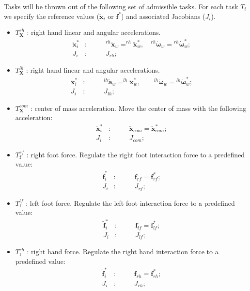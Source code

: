 \documentclass[12pt,a4paper,twoside]{article}
\begin{document}
Tasks will be thrown out  of the following set of admissible tasks. For each task $T_i$ we specify the reference values ($\ddot {\bm x}_i$ or $\bm f^*$) and associated Jacobians ($J_i$). 
\begin{itemize}

\item $T^{rh}_{\bm X}$ : right hand linear and angular accelerations. 
\begin{eqnarray*}
\ddot {\bm x}^*_{i} &:& \qquad ^{rh}{\ddot {\bm x}}_w = ^{rh}{\ddot {\bm x}}^*_w, \quad {}^{rh}{\dot {\bm \omega}}_w = {}^{rh}{\dot {\bm \omega}}_w^*;\\
J_i &:& \qquad J_{rh};
\end{eqnarray*}

\item $T^{lh}_{\bm X}$ : right hand linear and angular accelerations. 
\begin{eqnarray*}
\ddot {\bm x}^*_{i} &:& \qquad ^{lh}{\ddot {\bm a}}_w = ^{lh}{\ddot {\bm x}}^*_w, \qquad {}^{lh}{\dot {\bm \omega}}_w = {}^{lh}{\dot {\bm \omega}}_w^* ;\\
J_i &:& \qquad J_{lh};
\end{eqnarray*}

\item $T^{com}_{\bm X}$ : center of mass acceleration. Move the center of mass with the following acceleration: 
\begin{eqnarray*}
\ddot {\bm x}^*_{i} &:& \qquad \ddot {\bm x}_{com} = \ddot {\bm x}_{com}^* ;\\
J_i &:& \qquad J_{com};
\end{eqnarray*}

\item $T^{rf}_{\bm f}$ : right foot force. Regulate the right foot interaction force to a predefined value: \begin{eqnarray*}
\ddot {\bm f}^*_{i} &:& \qquad {\bm f}_{rf} = {\bm f}^*_{rf} ;\\
J_i &:& \qquad J_{rf};
\end{eqnarray*}

\item $T^{lf}_{\bm f}$ : left foot force. Regulate the left foot interaction force to a predefined value: 
\begin{eqnarray*}
\ddot {\bm f}^*_{i} &:& \qquad {\bm f}_{lf} = {\bm f}^*_{lf} ;\\
J_i &:& \qquad J_{lf};
\end{eqnarray*}

\item $T^{rh}_{\bm f}$ : right hand force. Regulate the right hand interaction force to a predefined value: \begin{eqnarray*}
\ddot {\bm f}^*_{i} &:& \qquad {\bm f}_{rh} = {\bm f}^*_{rh} ;\\
J_i &:& \qquad J_{rh};
\end{eqnarray*}


\end{itemize}
\end{document}
